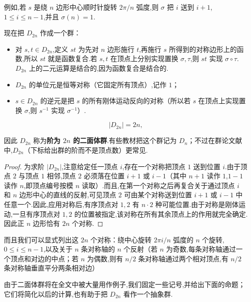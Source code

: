 例如,若 $s$ 是绕 $n$ 边形中心顺时针旋转 $2\pi/n$ 弧度,则 $\sigma$ 把 $i$ 送到 $i+1$,$1\leq i\leq n-1$,并且 $\sigma(n)=1$.

现在把 $D_{2n}$ 作成一个群：
\begin{itemize}
	\item 对 $s,t\in D_{2n}$,定义 $st$ 为先对 $n$ 边形施行 $t$,再施行 $s$ 所得到的对称边形上的函数,所以 $st$ 就是函数复合.若 $s,t$ 在顶点上分别实现置换 $\sigma,\tau$,则 $st$ 实现 $\sigma\circ\tau$.$D_{2n}$ 上的二元运算是结合的,因为函数复合是结合的.
	\item $D_{2n}$ 的单位元是恒等对称（它固定所有顶点）,记作 $1$；
	\item $s\in D_{2n}$ 的逆元是把 $s$ 的所有刚体运动反向的对称（所以若 $s$ 在顶点上实现置换 $\sigma$,则 $s^{-1}$ 实现 $\sigma^{-1}$）.
\end{itemize}
\begin{proposition}
	\[
|D_{2n}|=2n,
\]
\end{proposition}
因此 $D_{2n}$ 称为\textbf{阶为 $2n$ 的二面体群}.有些教材把这个群记为 $D_n$；不过在群论文献中,$D_{2n}$（下标给出群的阶而不是顶点数）更常见.
\begin{proof}
	为求阶 $|D_{2n}|$,注意给定任一顶点 $i$,存在一个对称把顶点 $1$ 送到位置 $i$.由于顶点 $2$ 与顶点 $1$ 相邻,顶点 $2$ 必须落在位置 $i+1$ 或 $i-1$（其中 $n+1$ 读作 $1$,$1-1$ 读作 $n$,即顶点编号按模 $n$ 读取）.而且,在第一个对称之后再复合关于通过顶点 $i$ 和 $n$ 边形中心的直线的反射,可见顶点 $2$ 可由某个对称送到位置 $i+1$ 或 $i-1$ 中任意一个.因此,应用对称后,有序顶点对 $1,2$ 有 $n\cdot2$ 种可能位置.由于对称是刚体运动,一旦有序顶点对 $1,2$ 的位置被指定,该对称在所有其余顶点上的作用就完全确定.因此正 $n$ 边形恰有 $2n$ 个对称.
\end{proof}
而且我们可以显式列出这 $2n$ 个对称：绕中心旋转 $2\pi i/n$ 弧度的 $n$ 个旋转,$0\leq i\leq n-1$,以及关于 $n$ 条对称轴的 $n$ 个反射（若 $n$ 为奇数,每条对称轴通过一个顶点和对边的中点；若 $n$ 为偶数,则有 $n/2$ 条对称轴通过两个相对顶点,有 $n/2$ 条对称轴垂直平分两条相对边）

由于二面体群将在全文中被大量用作例子,我们固定一些记号,并给出下面的命题；它们将简化以后的计算,也有助于把 $D_{2n}$ 看作一个抽象群.

